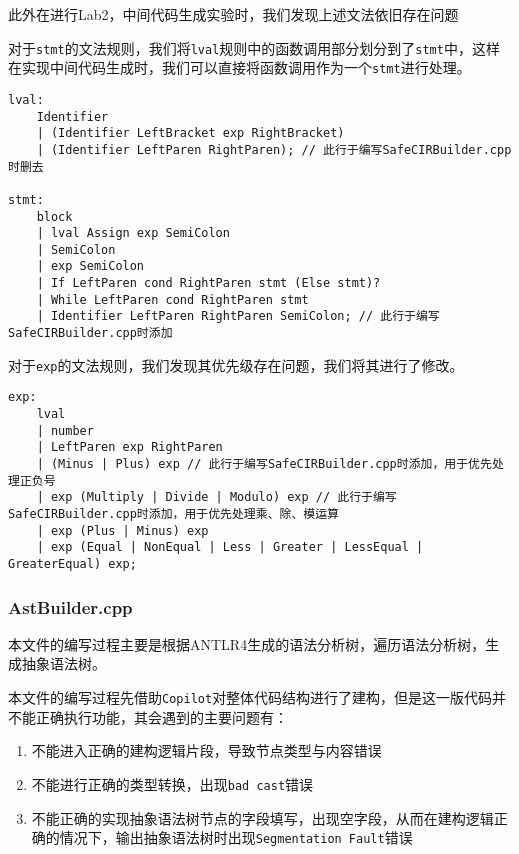 \documentclass[../main.tex]{subfiles}
\begin{document}
此外在进行Lab2，中间代码生成实验时，我们发现上述文法依旧存在问题

对于\texttt{stmt}的文法规则，我们将\texttt{lval}规则中的函数调用部分划分到了\texttt{stmt}中，这样在实现中间代码生成时，我们可以直接将函数调用作为一个\texttt{stmt}进行处理。

\begin{mdframed}
	\begin{verbatim}
lval: 
    Identifier 
    | (Identifier LeftBracket exp RightBracket)
    | (Identifier LeftParen RightParen); // 此行于编写SafeCIRBuilder.cpp时删去

stmt: 
    block
    | lval Assign exp SemiColon
    | SemiColon
    | exp SemiColon
    | If LeftParen cond RightParen stmt (Else stmt)?
    | While LeftParen cond RightParen stmt
    | Identifier LeftParen RightParen SemiColon; // 此行于编写SafeCIRBuilder.cpp时添加
  \end{verbatim}
\end{mdframed}

对于\texttt{exp}的文法规则，我们发现其优先级存在问题，我们将其进行了修改。

\begin{mdframed}
	\begin{verbatim}
exp:
    lval
    | number
    | LeftParen exp RightParen
    | (Minus | Plus) exp // 此行于编写SafeCIRBuilder.cpp时添加，用于优先处理正负号
    | exp (Multiply | Divide | Modulo) exp // 此行于编写SafeCIRBuilder.cpp时添加，用于优先处理乘、除、模运算
    | exp (Plus | Minus) exp
    | exp (Equal | NonEqual | Less | Greater | LessEqual | GreaterEqual) exp;
  \end{verbatim}
\end{mdframed}



\subsubsection{AstBuilder.cpp}

本文件的编写过程主要是根据ANTLR4生成的语法分析树，遍历语法分析树，生成抽象语法树。

本文件的编写过程先借助\texttt{Copilot}对整体代码结构进行了建构，但是这一版代码并不能正确执行功能，其会遇到的主要问题有：

\begin{enumerate}
	\item 不能进入正确的建构逻辑片段，导致节点类型与内容错误
	\item 不能进行正确的类型转换，出现\texttt{bad cast}错误
	\item 不能正确的实现抽象语法树节点的字段填写，出现空字段，从而在建构逻辑正确的情况下，输出抽象语法树时出现\texttt{Segmentation Fault}错误
\end{enumerate}
\end{document}
